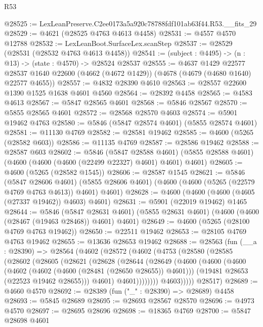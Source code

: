 \begin{lexlean}{R53}
\begin{coremodule}
@28525 := LexLeanPreserve.C2ee0173a5a920c78788fdf101ab63f44.R53.__fits_29
@28529 := @4621 (@28525 @4763 @4613 @4458)
@28531 := @4557 @4570 @12788
@28532 := LexLeanBoot.SurfaceLex.scanStep
@28537 := @28529 (@28531 (@28532 @4763 @4613 @4458))
@28541 := (subject : @4495) -> (n : @13) -> (state : @4570) -> @28524 @28537
@28555 := @4637
    @1429
    @22577
    @28537
    @1640
    @22600
    (@4662 (@4672 @1429))
    (@4678 (@4679 (@4680 @1640) @22577 @4655))
@28557 := @4832 @28390 @4610
@28563 := @28557 @22600 @1390 @1525 @1638 @4601 @4560
@28564 := @28392 @4458
@28565 := @4583 @4613
@28567 := @5847 @28565 @4601
@28568 := @5846 @28567
@28570 := @5855 @28565 @4601
@28572 := @28568 @28570 @4603
@28574 := @5901 @19462 @4763
@28580 := @5846 (@5847 @28574 @4601) (@5855 @28574 @4601)
@28581 := @11130 @4769
@28582 := @28581 @19462
@28585 := @4600 (@5265 (@28582 @603))
@28586 := @11135 @4769
@28587 := @28586 @19462
@28588 := @28587 @603
@28602 := @5846
    (@5847 @28588 @4601)
    (@5855 @28588 @4601)
    (@4600 (@4600 (@4600 (@22499 @22327) @4601) @4601) @4601)
@28605 := @4600 (@5265 (@28582 @1545))
@28606 := @28587 @1545
@28621 := @5846
    (@5847 @28606 @4601)
    (@5855 @28606 @4601)
    (@4600 (@4600 (@5265 (@22579 @4769 @4763 @4613)) @4601) @4601)
@28628 := @4600 (@4600 (@4600 (@4605 (@27337 @19462)) @4603) @4601)
@28631 := @5901 (@22019 @19462) @1465
@28644 := @5846
    (@5847 @28631 @4601)
    (@5855 @28631 @4601)
    (@4600 (@4600 (@28467 (@19463 @28468)) @4601) @4601)
@28649 := @4600 (@5265 (@28100 @4769 @4763 @19462))
@28650 := @22511 @19462
@28653 := @28105 @4769 @4763 @19462
@28655 := @13636 @28653 @19462
@28688 := @28563
    (fun (__a : @28390) =>
    @28564
      (@4602
        (@28572
          (@4602
            (@4753
              (@28580
                (@28585
                  (@28602
                    (@28605
                      (@28621
                        (@28628
                          (@28644
                            (@28649
                              (@4600
                                (@4600
                                  (@4600
                                    (@4602 (@4602 (@4600 (@28481 (@28650 @28655)) @4601)))
                                    (@19481 @28653 (@22523 @19462 @28655)))
                                  @4601)
                                @4601))))))))
                @4603)))))
      @28517)
@28689 := @4660 @4570
@28692 := @28389 (fun ("_" : @28390) => @28689) @4458
@28693 := @5845 @28689
@28695 := @28693 @28567 @28570
@28696 := @4973 @4570
@28697 := @28695 @28696
@28698 := @18365 @4769
@28700 := @5847 @28698 @4601

\end{coremodule}
\end{lexlean}

